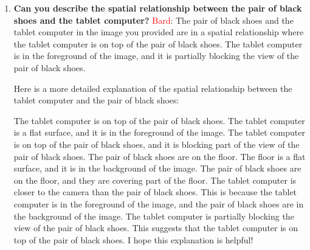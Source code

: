 \begin{enumerate}
    \item \textbf{Can you describe the spatial relationship between the pair of black shoes and the tablet computer?}
    \subitem \textcolor{Red}{Bard}: The pair of black shoes and the tablet computer in the image you provided are in a spatial relationship where the tablet computer is on top of the pair of black shoes. The tablet computer is in the foreground of the image, and it is partially blocking the view of the pair of black shoes.

    Here is a more detailed explanation of the spatial relationship between the tablet computer and the pair of black shoes:
    
    The tablet computer is on top of the pair of black shoes. The tablet computer is a flat surface, and it is in the foreground of the image. The tablet computer is on top of the pair of black shoes, and it is blocking part of the view of the pair of black shoes.
    The pair of black shoes are on the floor. The floor is a flat surface, and it is in the background of the image. The pair of black shoes are on the floor, and they are covering part of the floor.
    The tablet computer is closer to the camera than the pair of black shoes. This is because the tablet computer is in the foreground of the image, and the pair of black shoes are in the background of the image.
    The tablet computer is partially blocking the view of the pair of black shoes. This suggests that the tablet computer is on top of the pair of black shoes.
    I hope this explanation is helpful!
    

\end{enumerate}
